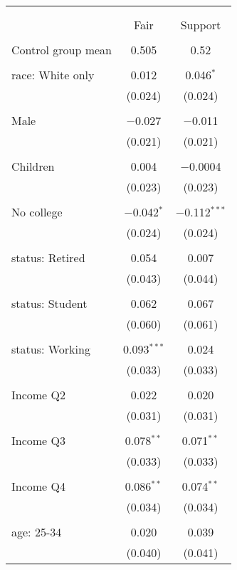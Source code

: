 
\begin{tabular}{@{\extracolsep{5pt}}lcc} 
\\[-1.8ex]\hline 
\hline \\[-1.8ex] 
\\[-1.8ex] & Fair & Support \\ 
\hline \\[-1.8ex] 
 Control group mean & 0.505 & 0.52  \\ \hline \\[-1.8ex] race: White only & 0.012 & 0.046$^{*}$ \\ 
  & (0.024) & (0.024) \\ 
  & & \\ 
 Male & $-$0.027 & $-$0.011 \\ 
  & (0.021) & (0.021) \\ 
  & & \\ 
 Children & 0.004 & $-$0.0004 \\ 
  & (0.023) & (0.023) \\ 
  & & \\ 
 No college & $-$0.042$^{*}$ & $-$0.112$^{***}$ \\ 
  & (0.024) & (0.024) \\ 
  & & \\ 
 status: Retired & 0.054 & 0.007 \\ 
  & (0.043) & (0.044) \\ 
  & & \\ 
 status: Student & 0.062 & 0.067 \\ 
  & (0.060) & (0.061) \\ 
  & & \\ 
 status: Working & 0.093$^{***}$ & 0.024 \\ 
  & (0.033) & (0.033) \\ 
  & & \\ 
 Income Q2 & 0.022 & 0.020 \\ 
  & (0.031) & (0.031) \\ 
  & & \\ 
 Income Q3 & 0.078$^{**}$ & 0.071$^{**}$ \\ 
  & (0.033) & (0.033) \\ 
  & & \\ 
 Income Q4 & 0.086$^{**}$ & 0.074$^{**}$ \\ 
  & (0.034) & (0.034) \\ 
  & & \\ 
 age: 25-34 & 0.020 & 0.039 \\ 
  & (0.040) & (0.041) \\ 

\end{tabular}
